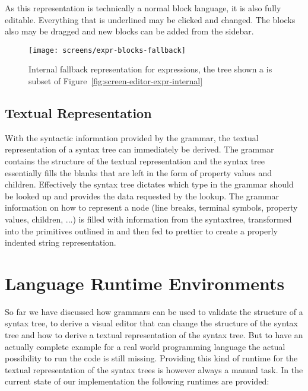 \documentclass[sigconf,natbib=false]{acmart}
\begin{document}
As this representation is technically a normal block language, it is also fully editable. Everything that is underlined may be clicked and changed. The blocks also may be dragged and new blocks can be added from the sidebar.

\begin{figure}
  \texttt{[image: screens/expr-blocks-fallback]}
  \caption{Internal fallback representation for expressions, the tree shown a is subset of Figure~\ref{fig:screen-editor-expr-internal}}
  \label{fig:screen-editor-expr-fallback}
\end{figure}

\subsection{Textual Representation}

With the syntactic information provided by the grammar, the textual representation of a syntax tree can immediately be derived. The grammar contains the structure of the textual representation and the syntax tree essentially fills the blanks that are left in the form of property values and children. Effectively the syntax tree dictates which type in the grammar should be looked up and provides the data requested by the lookup. The grammar information on how to represent a node (line breaks, terminal symbols, property values, children, ...) is filled with information from the syntaxtree, transformed into the primitives outlined in \cite{wadler_prettier_printer} and then fed to prettier to create a properly indented string representation.

\section{Language Runtime Environments}
So far we have discussed how grammars can be used to validate the structure of a syntax tree, to derive a visual editor that can change the structure of the syntax tree and how to derive a textual representation of the syntax tree. But to have an actually complete example for a real world programming language the actual possibility to run the code is still missing. Providing this kind of runtime for the textual representation of the syntax trees is however always a manual task. In the current state of our implementation the following runtimes are provided:
\end{document}
